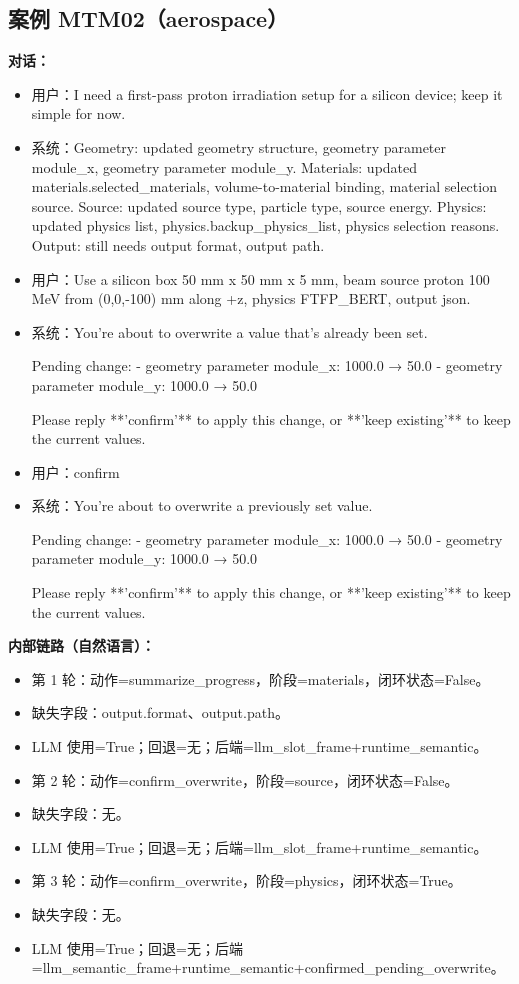\documentclass[11pt]{ctexart}
\begin{document}
\subsection{案例 MTM02（aerospace）}
\textbf{对话：}
\begin{itemize}
\item 用户：I need a first-pass proton irradiation setup for a silicon device; keep it simple for now.
\item 系统：Geometry: updated geometry structure, geometry parameter module\_x, geometry parameter module\_y. Materials: updated materials.selected\_materials, volume-to-material binding, material selection source. Source: updated source type, particle type, source energy. Physics: updated physics list, physics.backup\_physics\_list, physics selection reasons. Output: still needs output format, output path.
\item 用户：Use a silicon box 50 mm x 50 mm x 5 mm, beam source proton 100 MeV from (0,0,-100) mm along +z, physics FTFP\_BERT, output json.
\item 系统：You're about to overwrite a value that's already been set.

Pending change:
- geometry parameter module\_x: 1000.0 → 50.0
- geometry parameter module\_y: 1000.0 → 50.0

Please reply **'confirm'** to apply this change, or **'keep existing'** to keep the current values.
\item 用户：confirm
\item 系统：You're about to overwrite a previously set value.

Pending change:
- geometry parameter module\_x: 1000.0 → 50.0
- geometry parameter module\_y: 1000.0 → 50.0

Please reply **'confirm'** to apply this change, or **'keep existing'** to keep the current values.
\end{itemize}
\textbf{内部链路（自然语言）：}
\begin{itemize}
\item 第 1 轮：动作=summarize\_progress，阶段=materials，闭环状态=False。
\item 缺失字段：output.format、output.path。
\item LLM 使用=True；回退=无；后端=llm\_slot\_frame+runtime\_semantic。
\item 第 2 轮：动作=confirm\_overwrite，阶段=source，闭环状态=False。
\item 缺失字段：无。
\item LLM 使用=True；回退=无；后端=llm\_slot\_frame+runtime\_semantic。
\item 第 3 轮：动作=confirm\_overwrite，阶段=physics，闭环状态=True。
\item 缺失字段：无。
\item LLM 使用=True；回退=无；后端=llm\_semantic\_frame+runtime\_semantic+confirmed\_pending\_overwrite。
\end{itemize}
\end{document}
